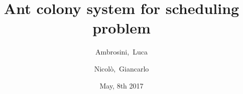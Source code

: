 



\title[ACS Scheduling]{
Ant colony system for scheduling problem
} %

\author[Ambrosini \and Nicol\`{o}]{Ambrosini,~Luca \and Nicol\`{o},~Giancarlo %
} %



\date[May, 8th 2017]{May, 8th 2017 }







